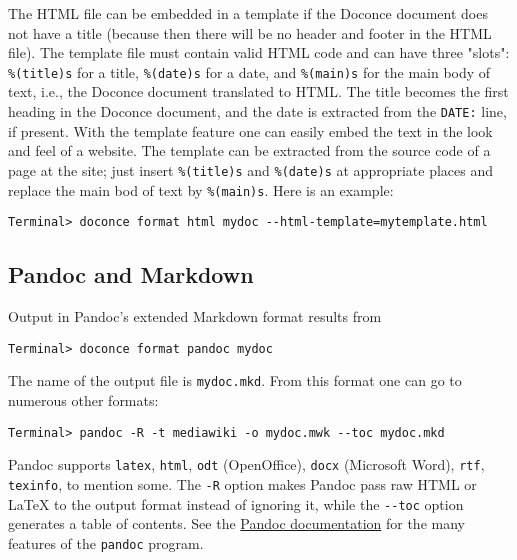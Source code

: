 \documentclass[twoside]{article}
\begin{document}
The HTML file can be embedded in a template if the Doconce document
does not have a title (because then there will be
no header and footer in the HTML file). The template file must contain
valid HTML code and can have three "slots": {\fontsize{10pt}{10pt}\verb!%(title)s!} for a title,
{\fontsize{10pt}{10pt}\verb!%(date)s!} for a date, and {\fontsize{10pt}{10pt}\verb!%(main)s!} for the main body of text, i.e., the
Doconce document translated to HTML. The title becomes the first
heading in the Doconce document, and the date is extracted from the
{\fontsize{10pt}{10pt}\verb!DATE:!} line, if present. With the template feature one can easily embed
the text in the look and feel of a website. The template can be extracted
from the source code of a page at the site; just insert {\fontsize{10pt}{10pt}\verb!%(title)s!} and
{\fontsize{10pt}{10pt}\verb!%(date)s!} at appropriate places and replace the main bod of text
by {\fontsize{10pt}{10pt}\verb!%(main)s!}. Here is an example:
\vspace{4pt}
\begin{Verbatim}[numbers=none,frame=lines,label=\fbox{{\tiny Terminal}},fontsize=\fontsize{9pt}{9pt},
labelposition=topline,framesep=2.5mm,framerule=0.7pt]
Terminal> doconce format html mydoc --html-template=mytemplate.html
\end{Verbatim}

\subsection{Pandoc and Markdown}

Output in Pandoc's extended Markdown format results from
\vspace{4pt}
\begin{Verbatim}[numbers=none,frame=lines,label=\fbox{{\tiny Terminal}},fontsize=\fontsize{9pt}{9pt},
labelposition=topline,framesep=2.5mm,framerule=0.7pt]
Terminal> doconce format pandoc mydoc
\end{Verbatim}
The name of the output file is {\fontsize{10pt}{10pt}\verb!mydoc.mkd!}.
From this format one can go to numerous other formats:
\vspace{4pt}
\begin{Verbatim}[numbers=none,frame=lines,label=\fbox{{\tiny Terminal}},fontsize=\fontsize{9pt}{9pt},
labelposition=topline,framesep=2.5mm,framerule=0.7pt]
Terminal> pandoc -R -t mediawiki -o mydoc.mwk --toc mydoc.mkd
\end{Verbatim}
Pandoc supports {\fontsize{10pt}{10pt}\verb!latex!}, {\fontsize{10pt}{10pt}\verb!html!}, {\fontsize{10pt}{10pt}\verb!odt!} (OpenOffice), {\fontsize{10pt}{10pt}\verb!docx!} (Microsoft
Word), {\fontsize{10pt}{10pt}\verb!rtf!}, {\fontsize{10pt}{10pt}\verb!texinfo!}, to mention some. The {\fontsize{10pt}{10pt}\verb!-R!} option makes
Pandoc pass raw HTML or {\LaTeX} to the output format instead of ignoring it,
while the {\fontsize{10pt}{10pt}\verb!--toc!} option generates a table of contents.
See the \href{{http://johnmacfarlane.net/pandoc/README.html}}{Pandoc documentation}
for the many features of the {\fontsize{10pt}{10pt}\verb!pandoc!} program.
\end{document}
